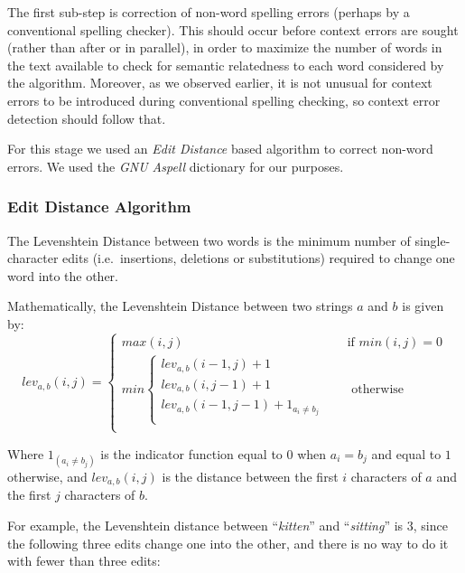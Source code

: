 

The first sub-step is correction of non-word spelling errors (perhaps by a
conventional spelling checker). This should occur before context errors are
sought (rather than after or in parallel), in order to maximize the number of
words in the text available to check for semantic relatedness to each word
considered by the algorithm. Moreover, as we observed earlier, it is not
unusual for context errors to be introduced during conventional spelling
checking, so context error detection should follow that.

For this stage we used an \textit{Edit Distance} based algorithm to correct non-word errors.
We used the \textit{GNU Aspell} dictionary for our purposes.

\subsubsection{Edit Distance Algorithm}

The Levenshtein Distance between two words is the minimum number of
single-character edits (i.e.\ insertions, deletions or substitutions) required
to change one word into the other.

Mathematically, the Levenshtein Distance between two strings \(a\) and \(b\) is given by:\\
\begin{equation}
lev_{a,b}(i,j) =
  \begin{cases}
    max(i,j)       & \quad \text{if } min(i,j) = 0\\
    min
    \begin{cases}
        lev_{a,b}(i - 1, j) + 1\\
        lev_{a,b}(i, j - 1) + 1\\
        lev_{a,b}(i - 1, j - 1) + 1_{a_i \neq b_j}\\
    \end{cases}    & \quad \text{ otherwise}\\
  \end{cases}
\end{equation}

Where \(1_{(a_i\neq b_j)}\) is the indicator function equal to \(0\) when
\(a_i=b_j\) and equal to \(1\) otherwise, and
\(lev_{a,b}(i,j)\) is the distance between the
first \(i\) characters of \(a\) and the first \(j\) characters of \(b\).

For example, the Levenshtein distance between ``\textit{kitten}'' and
``\textit{sitting}'' is \(3\), since the following three edits change one into
the other, and there is no way to do it with fewer than three edits:

